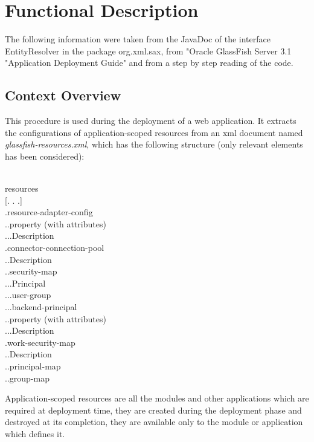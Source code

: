 \section{Functional Description}
The following information were taken from the JavaDoc of the interface EntityResolver in the package org.xml.sax, from "Oracle GlassFish Server 3.1 "Application Deployment Guide" and from a step by step reading of the code.
\subsection{Context Overview}
This procedure is used during the deployment of a web application. It extracts the configurations of application-scoped resources from an xml document named \textit{glassfish-resources.xml}, which has the following structure (only relevant elements has been considered):\\\\
\begin{myfontAPI}
resources \\
{[}. . .{]}\\
.\indent resource-adapter-config\\
.\indent .\indent property (with attributes)\\
.\indent .\indent .\indent Description\\
.\indent connector-connection-pool\\
.\indent .\indent Description\\
.\indent .\indent security-map\\
.\indent .\indent .\indent Principal\\
.\indent .\indent .\indent user-group\\
.\indent .\indent .\indent backend-principal\\
.\indent .\indent property (with attributes)\\
.\indent .\indent .\indent Description\\
.\indent work-security-map\\
.\indent .\indent Description\\
.\indent .\indent principal-map\\
.\indent .\indent group-map\\
\end{myfontAPI}

Application-scoped resources are all the modules and other applications which are required at deployment time, they are created during the deployment phase and destroyed at its completion, they are available only to the module or application which defines it.

